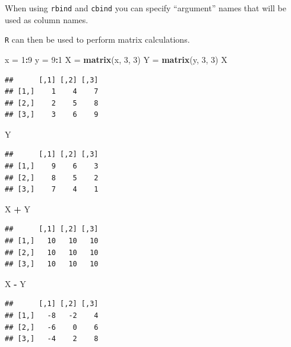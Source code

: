 \documentclass[]{book}
\newenvironment{Shaded}{\begin{snugshade}}{\end{snugshade}}
\newcommand{\KeywordTok}[1]{\textcolor[rgb]{0.13,0.29,0.53}{\textbf{#1}}}
\newcommand{\DecValTok}[1]{\textcolor[rgb]{0.00,0.00,0.81}{#1}}
\newcommand{\StringTok}[1]{\textcolor[rgb]{0.31,0.60,0.02}{#1}}
\newcommand{\OperatorTok}[1]{\textcolor[rgb]{0.81,0.36,0.00}{\textbf{#1}}}
\newcommand{\NormalTok}[1]{#1}
\theoremstyle{definition}
\theoremstyle{definition}
\theoremstyle{definition}
\theoremstyle{remark}
\begin{document}
When using \texttt{rbind} and \texttt{cbind} you can specify
``argument'' names that will be used as column names.

\texttt{R} can then be used to perform matrix calculations.

\begin{Shaded}
\begin{Highlighting}[]
\NormalTok{x =}\StringTok{ }\DecValTok{1}\OperatorTok{:}\DecValTok{9}
\NormalTok{y =}\StringTok{ }\DecValTok{9}\OperatorTok{:}\DecValTok{1}
\NormalTok{X =}\StringTok{ }\KeywordTok{matrix}\NormalTok{(x, }\DecValTok{3}\NormalTok{, }\DecValTok{3}\NormalTok{)}
\NormalTok{Y =}\StringTok{ }\KeywordTok{matrix}\NormalTok{(y, }\DecValTok{3}\NormalTok{, }\DecValTok{3}\NormalTok{)}
\NormalTok{X}
\end{Highlighting}
\end{Shaded}

\begin{verbatim}
##      [,1] [,2] [,3]
## [1,]    1    4    7
## [2,]    2    5    8
## [3,]    3    6    9
\end{verbatim}

\begin{Shaded}
\begin{Highlighting}[]
\NormalTok{Y}
\end{Highlighting}
\end{Shaded}

\begin{verbatim}
##      [,1] [,2] [,3]
## [1,]    9    6    3
## [2,]    8    5    2
## [3,]    7    4    1
\end{verbatim}

\begin{Shaded}
\begin{Highlighting}[]
\NormalTok{X }\OperatorTok{+}\StringTok{ }\NormalTok{Y}
\end{Highlighting}
\end{Shaded}

\begin{verbatim}
##      [,1] [,2] [,3]
## [1,]   10   10   10
## [2,]   10   10   10
## [3,]   10   10   10
\end{verbatim}

\begin{Shaded}
\begin{Highlighting}[]
\NormalTok{X }\OperatorTok{-}\StringTok{ }\NormalTok{Y}
\end{Highlighting}
\end{Shaded}

\begin{verbatim}
##      [,1] [,2] [,3]
## [1,]   -8   -2    4
## [2,]   -6    0    6
## [3,]   -4    2    8
\end{verbatim}
\end{document}
